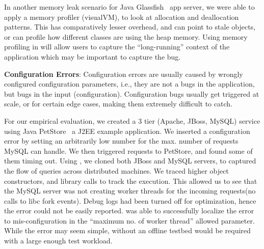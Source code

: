 In another memory leak scenario for Java Glassfish~\cite{glassfish} app server, we were able to apply a memory profiler (visualVM), to look at allocation and deallocation patterns.
This has comparatively lesser overhead, and can point to stale objects, or can profile how different classes are using the heap memory.
Using memory profiling in \parikshan will allow users to capture the ``long-running'' context of the application which may be important to capture the bug.
\fi

\noindent
\textbf{Configuration Errors}:
Configuration errors are usually caused by wrongly configured configuration parameters, i.e., they are not a bugs in the application, but bugs in the input (configuration).
Configuration bugs usually get triggered at scale, or for certain edge cases, making them extremely difficult to catch.

For our empirical evaluation, we created a 3 tier (Apache, JBoss, MySQL) service using Java PetStore~\cite{petstore} a J2EE example application.
We inserted a configuration error by setting an arbitrarily low number for the max. number of requests MySQL can handle.
We then triggered requests to PetStore, and found some of them timing out.
Using \parikshan, we cloned both JBoss and MySQL servers, to captured the flow of queries across distributed machines.
We traced higher object constructors, and library calls to track the execution.
This allowed us to see that the MySQL server was not creating worker threads for the incoming requests(no calls to libc fork events).
Debug logs had been turned off for optimization, hence the error could not be easily reported. 
\parikshan was able to successfully localize the error to mis-configuration in the ``maximum no. of worker thread'' allowed parameter.
While the error may seem simple, without \parikshan an offline testbed would be required with a large enough test workload.



